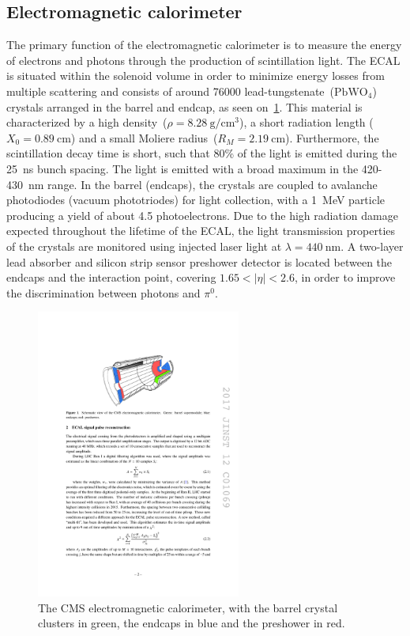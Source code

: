 \subsection{Electromagnetic calorimeter}
The primary function of the electromagnetic calorimeter is to measure the energy of electrons and photons through the production of scintillation light. The ECAL is situated within the solenoid volume in order to minimize energy losses from multiple scattering and consists of around 76000 lead-tungstenate~($\mathrm{PbWO}_4$) crystals arranged in the barrel and endcap, as seen on~\cref{fig:cms_ecal}. This material is characterized by a high density~($\rho = 8.28~\mathrm{g}/\mathrm{cm}^3$), a short radiation length ($X_0=0.89~\mathrm{cm}$) and a small Moliere radius~($R_M = 2.19~\mathrm{cm}$). Furthermore, the scintillation decay time is short, such that 80\% of the light is emitted during the 25~ns bunch spacing. The light is emitted with a broad maximum in the 420-430~nm range. In the barrel (endcaps), the crystals are coupled to avalanche photodiodes (vacuum phototriodes) for light collection, with a 1~MeV particle producing a yield of about 4.5 photoelectrons. Due to the high radiation damage expected throughout the lifetime of the ECAL, the light transmission properties of the crystals are monitored  using injected laser light at $\lambda = 440~\mathrm{nm}$. A two-layer lead absorber and silicon strip sensor preshower detector is located between the endcaps and the interaction point, covering $1.65 < |\eta| < 2.6$, in order to improve the discrimination between photons and $\pi^0$.

\begin{figure}
\begin{centering}
\includegraphics[width=0.6\textwidth]{figures/exp/ecal.pdf}
\caption[The structure of the CMS electromagnetic calorimeter]{The CMS electromagnetic calorimeter, with the barrel crystal clusters in green, the endcaps in blue and the preshower in red.}
\label{fig:cms_ecal}
\end{centering}
\end{figure}

